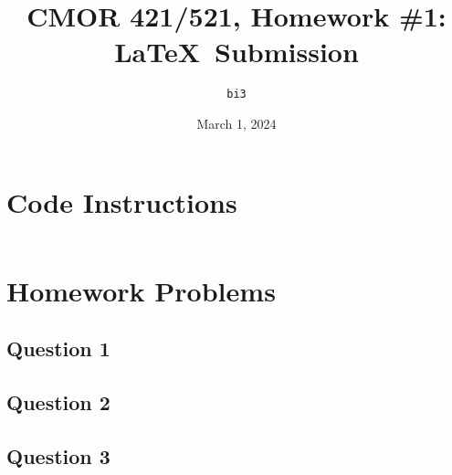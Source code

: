 \documentclass{article}
\begin{document}
\title{CMOR 421\slash521, Homework \#1: \LaTeX\ Submission}
\author{\texttt{bi3}}
\date{March 1, 2024}
\maketitle

\section*{Code Instructions}


\begin{verbatim}

\end{verbatim}


\section*{Homework Problems}

\subsection*{Question 1}



\subsection*{Question 2}



\subsection*{Question 3}
\end{document}
